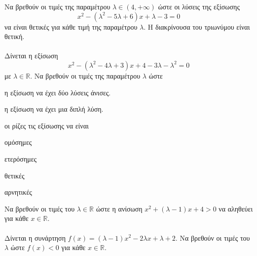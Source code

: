 \documentclass[11pt,a4paper,modern]{FFExercises}
\begin{document}
\askhsh Να βρεθούν οι τιμές της παραμέτρου $ \lambda\in(4,+\infty) $ ώστε οι λύσεις της εξίσωσης  \[ x^2-\left( \lambda^2-5\lambda+6\right) x+\lambda-3=0 \] να είναι θετικές για κάθε τιμή της παραμέτρου $ \lambda $. Η διακρίνουσα του τριωνύμου είναι θετική.\\\\
\askhsh Δίνεται η εξίσωση \[ x^2-\left(\lambda^2-4\lambda+3\right)x+4-3\lambda-\lambda^2=0 \] με $\lambda\in\mathbb{R}$. Να βρεθούν οι τιμές της παραμέτρου $ \lambda $ ώστε
\begin{alist}
\item η εξίσωση να έχει δύο λύσεις άνισες.
\item η εξίσωση να έχει μια διπλή λύση.
\item οι ρίζες τις εξίσωσης να είναι
\begin{rlist}
\item ομόσημες
\item ετερόσημες
\item θετικές
\item αρνητικές
\end{rlist}
\end{alist}
\askhsh Να βρεθούν οι τιμές του $\lambda\in\mathbb{R}$ ώστε η ανίσωση $ x^2+ (\lambda-1)x + 4 > 0 $ να αληθεύει για κάθε $ x\in\mathbb{R} $.\\\\
\askhsh Δίνεται η συνάρτηση $ f(x) = (\lambda-1)x^2 - 2\lambda x + \lambda + 2 $. Να βρεθούν οι τιμές του $\lambda$ ώστε $f(x) < 0$ για κάθε $x\in\mathbb{R}$.
\end{document}
